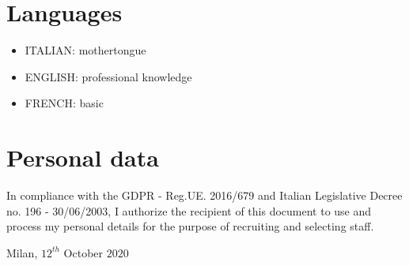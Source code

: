 \documentclass[11pt,a4paper,sans]{moderncv}        %
\begin{document}
\section{Languages}
\begin{itemize}
 \item ITALIAN: mothertongue
 \item ENGLISH: professional knowledge
 \item FRENCH: basic
\end{itemize} 

\section{Personal data}
In compliance with the GDPR - Reg.UE. 2016/679 and Italian Legislative Decree no. 196 - 30/06/2003, I authorize the recipient of this document to use and process my personal details for the purpose of recruiting and selecting staff. 



\bigskip 
\bigskip 
\bigskip 
\bigskip 
Milan, $12^{th}$ October $2020$
\end{document}
